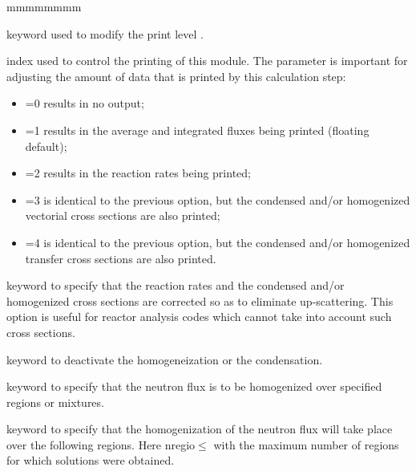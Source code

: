 \begin{ListeDeDescription}{mmmmmmmm}

\item[\moc{EDIT}] keyword used to modify the print level .

\item[\dusa{iprint}] index used to control the printing of this module. The
 parameter is important for adjusting the amount of data that is
printed by this calculation step:

\begin{itemize}

\item {}=0 results in no output;

\item {}=1 results in the average and integrated fluxes being printed
(floating default);

\item {}=2 results in the reaction rates being printed; 

\item {}=3 is identical to the previous option, but the condensed
and/or homogenized vectorial cross sections are also printed;

\item {}=4 is identical to the previous option, but the  condensed
and/or homogenized transfer cross sections are also printed.

\end{itemize}

\item[\moc{UPS}] keyword to specify that the reaction rates and the condensed
and/or homogenized cross sections are corrected so as to eliminate
up-scattering. This option is useful for reactor analysis codes which cannot
take into account such cross sections.

\item[\moc{NONE}] keyword to deactivate the homogeneization or the condensation. 

\item[\moc{MERG}] keyword to specify that the neutron flux is to be
homogenized over specified regions or mixtures. 

\item[\moc{REGI}] keyword to specify that the homogenization of the neutron
flux will take place over the following regions. Here nregio$\le$
with  the maximum number of regions for which solutions were
obtained.


\end{ListeDeDescription}
